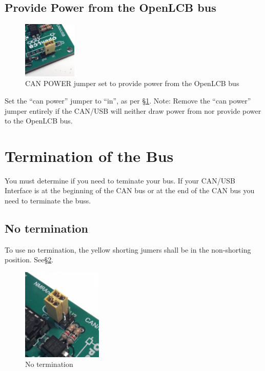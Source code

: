 \documentclass[11pt]{book}
\begin{document}
\subsection{Provide Power from the OpenLCB bus}
\begin{figure}[htbp]
\begin{center}
\includegraphics[width=1in]{images/power_in.png}
\caption{CAN POWER jumper set to provide power from the OpenLCB bus}
\label{CANIN}
\end{center}
\end{figure}
Set the ``can power'' jumper to ``in'', as per \S \ref{CANIN}.  Note: Remove the ``can power'' jumper entirely if the CAN/USB will neither draw power from nor provide power to the OpenLCB bus.
\section{Termination of the Bus}
You must determine if you need to teminate your bus.  If your CAN/USB Interface is at the beginning of the CAN bus or at the end of the CAN bus you need to terminate the buss.
\subsection{No termination}
\label{NoTerm}
To use no termination, the yellow shorting jumers shall be in the non-shorting position. See\S\ref{NoTerm}.
\begin{figure}[htbp]
\begin{center}
\includegraphics[width=1.5in]{images/term_none.png}
\caption{No termination}
\label{NoTerm}
\end{center}
\end{figure}
\end{document}
